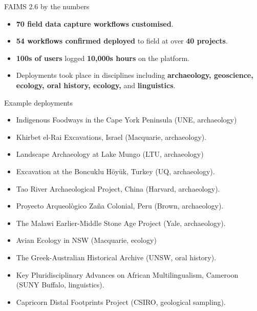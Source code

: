 
\begin{frame}{FAIMS 2.6 by the numbers}
 \begin{itemize}
        \item \textbf{70 field data capture workflows customised}.
        \item \textbf{54 workflows confirmed deployed} to field at over \textbf{40 projects}.
        \item \textbf{100s of users} logged \textbf{10,000s hours} on the platform.
        \item Deployments took place in disciplines including \textbf{archaeology, geoscience, ecology, oral history, ecology, }and \textbf{linguistics}.
    \end{itemize}
\end{frame}


\begin{frame}{Example deployments}
 \begin{itemize}
        \item Indigenous Foodways in the Cape York Peninsula (UNE, archaeology)
        \item Khirbet el-Rai Excavations, Israel (Macquarie, archaeology).
        \item Landscape Archaeology at Lake Mungo (LTU, archaeology)
        \item Excavation at the Boncuklu Höyük, Turkey (UQ, archaeology).
        \item Tao River Archaeological Project, China (Harvard, archaeology).
        \item Proyecto Arqueològico Zaña Colonial, Peru (Brown, archaeology).
        \item The Malawi Earlier-Middle Stone Age Project (Yale, archaeology).
        \item Avian Ecology in NSW (Macquarie, ecology)
        \item The Greek-Australian Historical Archive (UNSW, oral history).
        \item Key Pluridisciplinary Advances on African Multilingualism, Cameroon (SUNY Buffalo, linguistics).
        \item Capricorn Distal Footprints Project (CSIRO, geological sampling).

    \end{itemize}
\end{frame}
